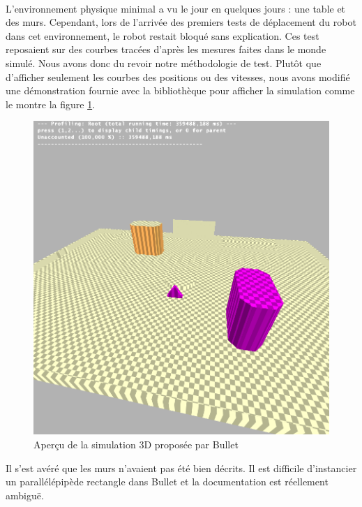 \paragraph{}

L'environnement physique minimal a vu le jour en quelques jours : une table et des murs. Cependant, lors de l'arrivée des premiers tests de déplacement du robot dans cet environnement, le robot restait bloqué sans explication. Ces test reposaient sur des courbes tracées d'après les mesures faites dans le monde simulé. Nous avons donc du revoir notre méthodologie de test. Plutôt que d'afficher seulement les courbes des positions ou des vitesses, nous avons modifié une démonstration fournie avec la bibliothèque pour afficher la simulation comme le montre la figure \ref{capture3d}.

\begin{figure}[!h]
\includegraphics[width=\textwidth]{capture3d.png} 
\caption{Aperçu de la simulation 3D proposée par Bullet}
\label{capture3d}
\end{figure}
\clearpage

Il s'est avéré que les murs n'avaient pas été bien décrits. Il est difficile d'instancier un parallélépipède rectangle dans Bullet et la documentation est réellement ambiguë.



